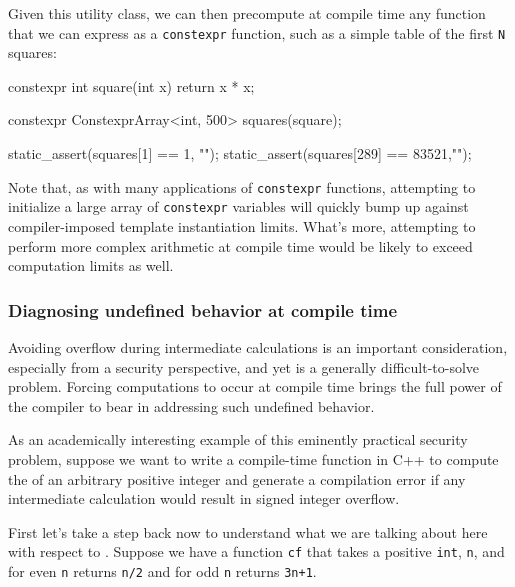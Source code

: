 Given this utility class, we can then precompute at compile time any
function that we can express as a \lstinline!constexpr! function, such as a
simple table of the first \lstinline!N! squares:

\begin{emcppslisting}[emcppsbatch=e3]
constexpr int square(int x) { return x * x; }

constexpr ConstexprArray<int, 500> squares(square);

static_assert(squares[1]   == 1,    "");
static_assert(squares[289] == 83521,"");
\end{emcppslisting}

\noindent Note that, as with many applications of \lstinline!constexpr! functions,
attempting to initialize a large array of \lstinline!constexpr! variables
will quickly bump up against compiler-imposed template instantiation
limits. What's more, attempting to perform more complex arithmetic at
compile time would be likely to exceed computation limits as well.

\subsubsection[Diagnosing undefined behavior at compile time]{Diagnosing undefined behavior at compile time}\label{diagnosing-undefined-behavior-at-compile-time}

Avoiding overflow during intermediate calculations is an important
consideration, especially from a security perspective, and yet is a
generally difficult-to-solve problem. Forcing computations to occur at
compile time brings the full power of the compiler to bear in addressing
such undefined behavior.

As an academically interesting example of this eminently practical
security problem, suppose we want to write a compile-time function in
C++ to compute the  of an arbitrary positive
integer and generate a compilation error if any intermediate calculation
would result in signed integer overflow.

First let's take a step back now to understand what we are talking about
here with respect to . Suppose we have a function
\lstinline!cf! that takes a positive \lstinline!int!, \lstinline!n!, and for even
\lstinline!n! returns \lstinline!n/2! and for odd \lstinline!n! returns
\lstinline!3n+1!.


